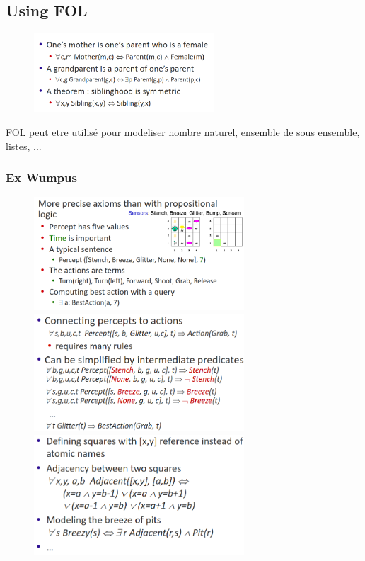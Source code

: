 \documentclass[12pt]{article}
\begin{document}
	\subsection{Using FOL}
		\begin{figure}[htp]	
			\centering
			\includegraphics[width=0.6\textwidth]{img/FOL3.png}
		\end{figure}
		
		FOL peut etre utilisé pour modeliser nombre naturel, ensemble de sous ensemble, listes, ...
			
		\subsubsection{Ex Wumpus}
			\begin{figure}[htp]	
				\centering
				\includegraphics[width=0.7\textwidth]{img/FOL4.png}
				\includegraphics[width=0.7\textwidth]{img/FOL5.png}
				\includegraphics[width=0.7\textwidth]{img/FOL6.png}

			\end{figure}
\end{document}

